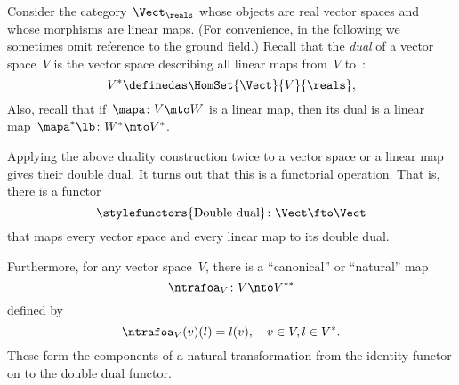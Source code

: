 \begin{example}
    \label{ex:Vect}
    Consider the category~$\Vect_{\reals}$ whose objects are real vector spaces and whose morphisms are linear maps.
    (For convenience, in the following we sometimes omit reference to the ground field.)
    Recall that the \emph{dual} of a vector space~$V$ is the vector space describing all linear maps from~$V$ to~\reals:
    \begin{equation}
        \label{eq:dual-vector-space}
        V^* \definedas \HomSet{\Vect}{V}{\reals},
    \end{equation}
    Also, recall that if~$\mapa\colon V \mto W$ is a linear map, then its dual is a linear map~$\mapa^* \lb  \colon W^* \mto V^*$.

    Applying the above duality construction twice to a vector space or a linear map gives their double dual.
    It turns out that this is a functorial operation.
    That is, there is a functor
    \begin{equation}
        \label{eq:double-dual-functor}
        \text{\stylefunctors{Double dual}}\colon \Vect \fto \Vect
    \end{equation}
    that maps every vector space and every linear map to its double dual.

    Furthermore, for any vector space~$V$, there is a ``canonical'' or ``natural'' map~
    \begin{equation}
        \ntrafoa_V \colon V \nto V^{**}
    \end{equation}
    defined by
    \begin{equation}
        \label{eq:natural-trafo-to-double-dual}
        \ntrafoa_V(v)(l) = l(v), \quad  v \in V, l \in V^*.
    \end{equation}
    These form the components of a natural transformation from the identity functor on \Vect to the double dual functor.
    \begin{center}
    \end{center}
\end{example}

